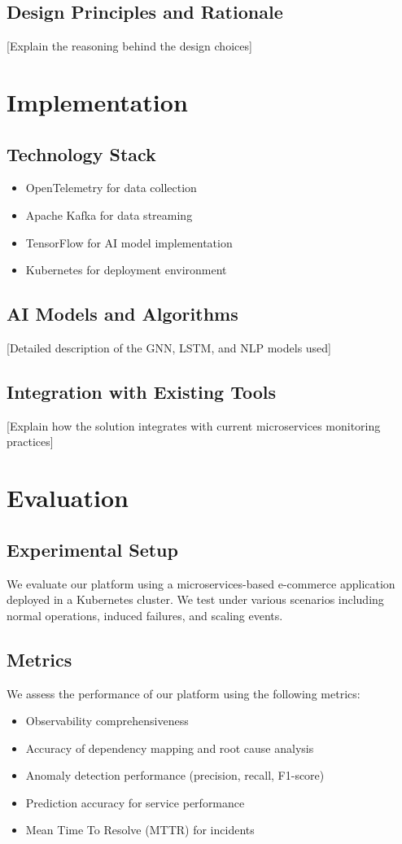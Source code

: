 \documentclass[10pt,journal,compsoc]{IEEEtran}
\begin{document}
\subsection{Design Principles and Rationale}
[Explain the reasoning behind the design choices]

\section{Implementation}
\subsection{Technology Stack}
\begin{itemize}
    \item OpenTelemetry for data collection
    \item Apache Kafka for data streaming
    \item TensorFlow for AI model implementation
    \item Kubernetes for deployment environment
\end{itemize}

\subsection{AI Models and Algorithms}
[Detailed description of the GNN, LSTM, and NLP models used]

\subsection{Integration with Existing Tools}
[Explain how the solution integrates with current microservices monitoring practices]

\section{Evaluation}
\subsection{Experimental Setup}
We evaluate our platform using a microservices-based e-commerce application deployed in a Kubernetes cluster. We test under various scenarios including normal operations, induced failures, and scaling events.

\subsection{Metrics}
We assess the performance of our platform using the following metrics:
\begin{itemize}
    \item Observability comprehensiveness
    \item Accuracy of dependency mapping and root cause analysis
    \item Anomaly detection performance (precision, recall, F1-score)
    \item Prediction accuracy for service performance
    \item Mean Time To Resolve (MTTR) for incidents
\end{itemize}
\end{document}
